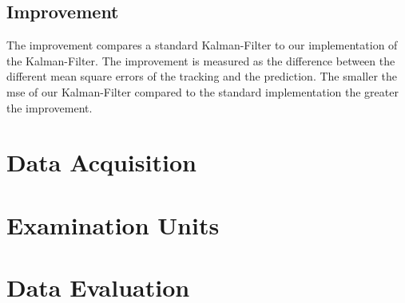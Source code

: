 \documentclass[titlepage, a4paper, 11pt]{scrartcl}
\begin{document}
\subsection{Improvement}

The improvement compares a standard Kalman-Filter to our implementation of the Kalman-Filter.
The improvement is measured as the difference between the different mean square errors of the tracking and the prediction.
The smaller the mse of our Kalman-Filter compared to the standard implementation the greater the improvement.

\section{Data Acquisition}

\section{Examination Units}

\section{Data Evaluation}


 

\end{document}

